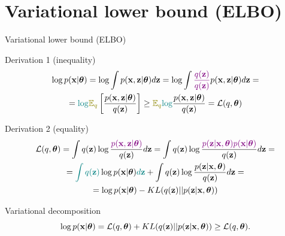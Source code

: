 \section{Variational lower bound (ELBO)}
\begin{frame}{Variational lower bound (ELBO)}
	\begin{block}{Derivation 1 (inequality)}
		\vspace{-0.7cm}
		\begin{multline*}
			\log p(\bx| \btheta) 
			= \log \int p(\bx, \bz | \btheta) d\bz = \log \int {\color{violet}\frac{q(\bz)}{q(\bz)}} p(\bx, \bz | \btheta) d\bz = \\
			= {\color{teal}\log} {\color{olive}\bbE_{q}} \left[\frac{p(\bx, \bz| \btheta)}{q(\bz)} \right] \geq {\color{olive}\bbE_{q}} {\color{teal}\log} \frac{p(\bx, \bz| \btheta)}{q(\bz)} =  \cL(q, \btheta)
		\end{multline*}
		\vspace{-0.7cm}
	\end{block}
	\begin{block}{Derivation 2 (equality)}
		\vspace{-0.7cm}
		\begin{multline*}
			\mathcal{L} (q, \boldsymbol{\theta}) = \int q(\mathbf{z}) \log \frac{\color{violet}p(\mathbf{x}, \mathbf{z} | \boldsymbol{\theta})}{q(\mathbf{z})}d\mathbf{z} = 
			\int q(\mathbf{z}) \log \frac{\color{violet}p(\mathbf{z}|\mathbf{x}, \boldsymbol{\theta})p(\mathbf{x}| \boldsymbol{\theta})}{q(\mathbf{z})}d\mathbf{z} = \\
			= {\color{teal}\int q(\mathbf{z})} \log p(\mathbf{x}| \boldsymbol{\theta}) {\color{teal}d\mathbf{z}} + \int q(\mathbf{z}) \log \frac{p(\mathbf{z}|\mathbf{x}, \boldsymbol{\theta})}{q(\mathbf{z})}d\mathbf{z} = \\
			= \log p(\mathbf{x}| \boldsymbol{\theta}) - KL(q(\mathbf{z}) || p(\mathbf{z}|\mathbf{x}, \boldsymbol{\theta}))
		\end{multline*}
	\end{block}
	\vspace{-0.7cm}
	\begin{block}{Variational decomposition}
		\[
			\log p(\mathbf{x}| \boldsymbol{\theta}) = \mathcal{L} (q, \boldsymbol{\theta}) + KL(q(\mathbf{z}) || p(\mathbf{z}|\mathbf{x}, \boldsymbol{\theta})) \geq \mathcal{L} (q, \boldsymbol{\theta}).
		\]
	\end{block}
\end{frame}
